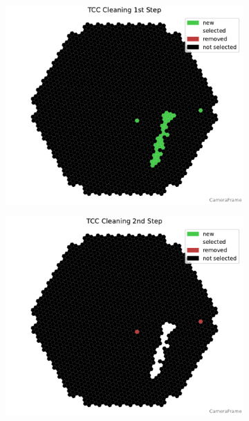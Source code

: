 \begin{figure}
    \centering
    \begin{subfigure}[t]{0.32\textwidth}
        \includegraphics[width=\textwidth]{plots/cleaner_steps/tcc_1.pdf}
    \end{subfigure}
    \hfill
    \begin{subfigure}[t]{0.32\textwidth}
        \includegraphics[width=\textwidth]{plots/cleaner_steps/tcc_2.pdf}
    \end{subfigure}
    \hfill
    \begin{subfigure}[t]{0.32\textwidth}

\end{subfigure}
\end{figure}

